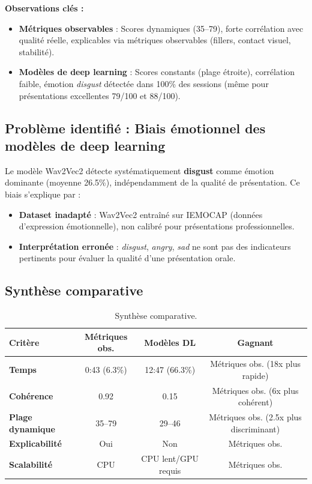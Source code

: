 \documentclass[12pt,a4paper]{article}
\begin{document}
\textbf{Observations clés :}
\begin{itemize}
    \item \textbf{Métriques observables} : Scores dynamiques (35--79), forte corrélation avec qualité réelle, explicables via métriques observables (fillers, contact visuel, stabilité).
    \item \textbf{Modèles de deep learning} : Scores constants (plage étroite), corrélation faible, émotion \textit{disgust} détectée dans 100\% des sessions (même pour présentations excellentes 79/100 et 88/100).
\end{itemize}

\subsection{Problème identifié : Biais émotionnel des modèles de deep learning}

Le modèle Wav2Vec2 détecte systématiquement \textbf{disgust} comme émotion dominante (moyenne 26.5\%), indépendamment de la qualité de présentation. Ce biais s'explique par :
\begin{itemize}
    \item \textbf{Dataset inadapté} : Wav2Vec2 entraîné sur IEMOCAP (données d'expression émotionnelle), non calibré pour présentations professionnelles.
    \item \textbf{Interprétation erronée} : \textit{disgust}, \textit{angry}, \textit{sad} ne sont pas des indicateurs pertinents pour évaluer la qualité d'une présentation orale.
\end{itemize}

\subsection{Synthèse comparative}

\begin{table}[H]
    \centering
    \footnotesize
    \begin{tabularx}{\textwidth}{@{}lccc@{}}
        \toprule
        \textbf{Critère} & \textbf{Métriques obs.} & \textbf{Modèles DL} & \textbf{Gagnant} \\
        \midrule
        \textbf{Temps} & 0:43 (6.3\%) & 12:47 (66.3\%) & Métriques obs. (18x plus rapide) \\
        \textbf{Cohérence} & 0.92 & 0.15 & Métriques obs. (6x plus cohérent) \\
        \textbf{Plage dynamique} & 35--79 & 29--46 & Métriques obs. (2.5x plus discriminant) \\
        \textbf{Explicabilité} & Oui & Non & Métriques obs. \\
        \textbf{Scalabilité} & CPU & CPU lent/GPU requis & Métriques obs. \\
        \bottomrule
    \end{tabularx}
    \caption{Synthèse comparative.}
\end{table}
\end{document}
